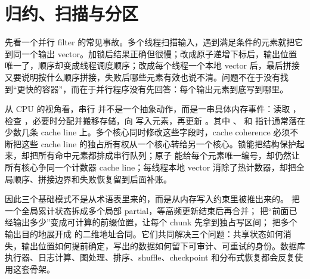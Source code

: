 \chapter{归约、扫描与分区}

先看一个并行 filter 的常见事故。多个线程扫描输入，遇到满足条件的元素就把它  到同一个输出 vector。加锁后结果正确但很慢；改成原子递增下标后，输出位置唯一了，顺序却变成线程调度顺序；改成每个线程一个本地 vector 后，最后拼接又要说明按什么顺序拼接，失败后哪些元素有效也说不清。问题不在于没有找到“更快的容器”，而在于并行程序没有先回答：每个输出元素到底写到哪里。

从 CPU 的视角看，串行  并不是一个抽象动作，而是一串具体内存事件：读取 ，检查 ，必要时分配并搬移存储，向  写入元素，再更新 。其中 、 和  指针通常落在少数几条 cache line 上。多个核心同时修改这些字段时，cache coherence 必须不断把这些 cache line 的独占所有权从一个核心转给另一个核心。锁能把结构保护起来，却把所有命中元素都排成串行队列；原子  能给每个元素唯一编号，却仍然让所有核心争同一个计数器 cache line；每线程本地 vector 消除了热计数器，却把全局顺序、拼接边界和失败恢复留到后面补账。

因此三个基础模式不是从术语表里来的，而是从内存写入约束里被推出来的。 把一个全局累计状态拆成多个局部 partial，等高频更新结束后再合并； 把“前面已经输出多少”变成可计算的前缀位置，让每个 chunk 先拿到独占写区间； 把多个输出目的地展开成  的二维地址合同。它们共同解决三个问题：共享状态如何消失，输出位置如何提前确定，写出的数据如何留下可审计、可重试的身份。数据库执行器、日志计算、图处理、排序、shuffle、checkpoint 和分布式恢复都会反复使用这套骨架。


